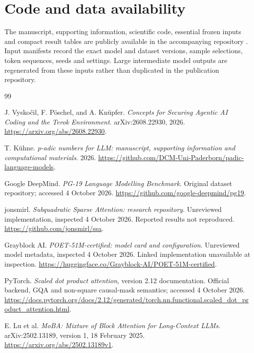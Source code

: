 \documentclass[11pt]{article}
\begin{document}
\section*{Code and data availability}

The manuscript, supporting information, scientific code, essential frozen
inputs and compact result tables are publicly available in the accompanying
repository \citep{padiclmrepo}. Input manifests record the exact model and
dataset versions, sample selections, token sequences, seeds and settings.
Large intermediate model outputs are regenerated from these inputs rather
than duplicated in the publication repository.

\clearpage
\begin{thebibliography}{99}

J. Vysko\v{c}il, F. P\"oschel, and A. Kn\"upfer.
\emph{Concepts for Securing Agentic AI Coding and the Terok Environment}.
arXiv:2608.22930, 2026.
\url{https://arxiv.org/abs/2608.22930}.

T. K\"uhne. \emph{p-adic numbers for LLM: manuscript, supporting information
and computational materials}. 2026.
\url{https://github.com/DCM-Uni-Paderborn/padic-language-models}.

Google DeepMind. \emph{PG-19 Language Modelling Benchmark}.
Original dataset repository; accessed 4 October 2026.
\url{https://github.com/google-deepmind/pg19}.

jonsmirl. \emph{Subquadratic Sparse Attention: research repository}.
Unreviewed implementation, inspected 4 October 2026. Reported results not reproduced.
\url{https://github.com/jonsmirl/ssa}.

Grayblock AI. \emph{POET-51M-certified: model card and configuration}.
Unreviewed model metadata, inspected 4 October 2026. Linked implementation unavailable at inspection.
\url{https://huggingface.co/Grayblock-AI/POET-51M-certified}.

PyTorch. \emph{Scaled dot product attention}, version 2.12 documentation.
Official backend, GQA and non-square causal-mask semantics; accessed
4 October 2026.
\url{https://docs.pytorch.org/docs/2.12/generated/torch.nn.functional.scaled_dot_product_attention.html}.


E. Lu et al. \emph{MoBA: Mixture of Block Attention for Long-Context LLMs}.
arXiv:2502.13189, version 1, 18 February 2025.
\url{https://arxiv.org/abs/2502.13189v1}.


\end{thebibliography}
\end{document}
